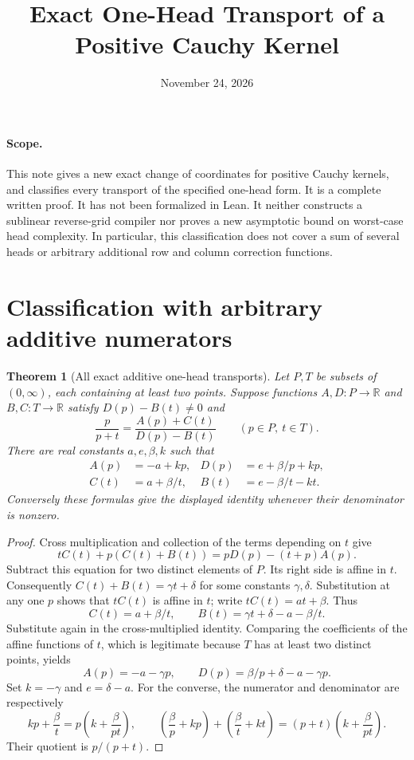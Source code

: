 \documentclass[11pt]{article}
\newtheorem{theorem}{Theorem}
\begin{document}
\title{Exact One-Head Transport of a Positive Cauchy Kernel}
\author{}
\date{November 24, 2026}
\maketitle

\paragraph{Scope.}
This note gives a new exact change of coordinates for positive Cauchy
kernels, and classifies every transport of the specified one-head form.
It is a complete written proof. It has not been formalized in Lean.
It neither constructs a sublinear reverse-grid compiler nor proves a
new asymptotic bound on worst-case head complexity. In particular,
this classification does not cover a sum of several heads or arbitrary
additional row and column correction functions.

\section{Classification with arbitrary additive numerators}

\begin{theorem}[All exact additive one-head transports]
Let $P,T$ be subsets of $(0,\infty)$, each containing at least two
points. Suppose functions $A,D:P\to\mathbb R$ and
$B,C:T\to\mathbb R$ satisfy $D(p)-B(t)\ne0$ and
\[
 \frac{p}{p+t}=\frac{A(p)+C(t)}{D(p)-B(t)}
 \qquad(p\in P,\ t\in T).
\]
There are real constants $a,e,\beta,k$ such that
\[
 \begin{aligned}
 A(p)&=-a+kp,&D(p)&=e+\beta/p+kp,\\
 C(t)&=a+\beta/t,&B(t)&=e-\beta/t-kt.
 \end{aligned}
\]
Conversely these formulas give the displayed identity whenever their
denominator is nonzero.
\end{theorem}

\begin{proof}
Cross multiplication and collection of the terms depending on $t$ give
\[
 tC(t)+p(C(t)+B(t))=pD(p)-(t+p)A(p).
\]
Subtract this equation for two distinct elements of $P$. Its right
side is affine in $t$. Consequently $C(t)+B(t)=\gamma t+\delta$
for some constants $\gamma,\delta$. Substitution at any one $p$
shows that $tC(t)$ is affine in $t$; write $tC(t)=at+\beta$.
Thus
\[
 C(t)=a+\beta/t,\qquad
 B(t)=\gamma t+\delta-a-\beta/t.
\]
Substitute again in the cross-multiplied identity. Comparing the
coefficients of the affine functions of $t$, which is legitimate
because $T$ has at least two distinct points, yields
\[
 A(p)=-a-\gamma p,\qquad
 D(p)=\beta/p+\delta-a-\gamma p.
\]
Set $k=-\gamma$ and $e=\delta-a$.
For the converse, the numerator and denominator are respectively
\[
 kp+\frac\beta t
   =p\left(k+\frac\beta{pt}\right),\qquad
 \left(\frac\beta p+kp\right)+
 \left(\frac\beta t+kt\right)
   =(p+t)\left(k+\frac\beta{pt}\right).
\]
Their quotient is $p/(p+t)$.
\end{proof}
\end{document}
